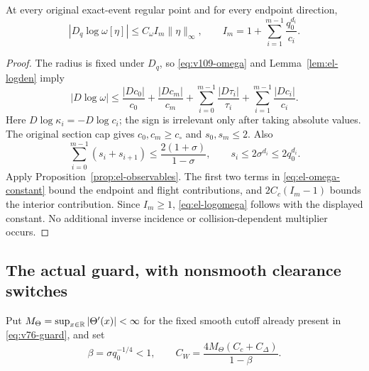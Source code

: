 \begin{proposition}
\label{prop:el-logomega}
At every original exact-event regular point and for every endpoint
direction,
\begin{equation}\label{eq:el-logomega}
 |D_q\log\omega[\eta]|
     \leq C_\omega I_m\|\eta\|_\infty,
 \qquad I_m=1+\sum_{i=1}^{m-1}\frac{q_0^{d_i}}{c_i}.
\end{equation}
\end{proposition}
\begin{proof}
The radius is fixed under $D_q$, so
\eqref{eq:v109-omega} and Lemma~\ref{lem:el-logden} imply
\[
 |D\log\omega|
 \leq\frac{|Dc_0|}{c_0}+\frac{|Dc_m|}{c_m}
       +\sum_{i=0}^{m-1}\frac{|D\tau_i|}{\tau_i}
       +\sum_{i=1}^{m-1}\frac{|Dc_i|}{c_i}.
\]
Here $D\log\kappa_i=-D\log c_i$; the sign is irrelevant only after
taking absolute values. The original section cap gives
$c_0,c_m\geq c_\circ$ and $s_0,s_m\leq2$. Also
\[
 \sum_{i=0}^{m-1}(s_i+s_{i+1})
 \leq\frac{2(1+\sigma)}{1-\sigma},\qquad
 s_i\leq2\sigma^{d_i}\leq2q_0^{d_i}.
\]
Apply Proposition~\ref{prop:el-observables}. The first two terms in
\eqref{eq:el-omega-constant} bound the endpoint and flight contributions,
and $2C_c(I_m-1)$ bounds the interior contribution. Since $I_m\geq1$,
\eqref{eq:el-logomega} follows with the displayed constant. No additional
inverse incidence or collision-dependent multiplier occurs.
\end{proof}

\subsection{The actual guard, with nonsmooth clearance switches}
Put $M_\Theta=\sup_{x\in\mathbb R}|\Theta'(x)|<\infty$ for the fixed
smooth cutoff already present in \eqref{eq:v76-guard}, and set
\begin{equation}\label{eq:el-guard-constant}
 \beta=\sigma q_0^{-1/4}<1,\qquad
 C_W=\frac{4M_\Theta(C_c+C_\Delta)}{1-\beta}.
\end{equation}

